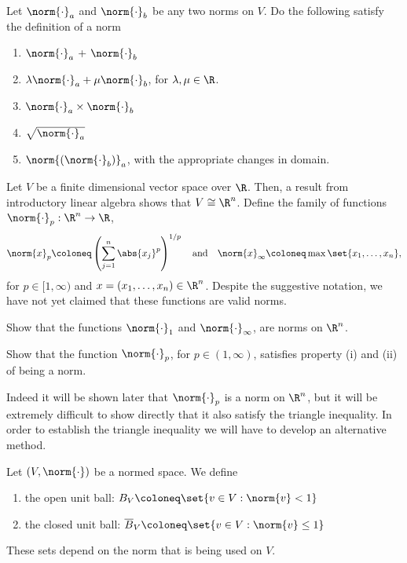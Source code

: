 \documentclass[draft]{penrose}
\newcommand{\oB}{B}
\newcommand{\cB}{\overline{B}}
\begin{document}
\begin{nex}
  Let $\norm{\cdot}_a$ and $\norm{\cdot}_b$ be any two norms on $V$. Do the following satisfy the definition of a norm
  \begin{enumerate}
  \item $\norm{\cdot}_a$ + $\norm{\cdot}_b$
  \item $\lambda\norm{\cdot}_a + \mu\norm{\cdot}_b$, for $\lambda, \mu \in \R$.
  \item $\norm{\cdot}_a \times \norm{\cdot}_b$
  \item $\sqrt{\norm{\cdot}_{a}}$
  \item $\norm{\left(\norm{\cdot}_b\right)}_{a}$, with the appropriate changes in domain.
  \end{enumerate}
\end{nex}

Let $V$ be a finite dimensional vector space over $\R$. Then, a result from introductory linear algebra shows that $V \cong \R^n$. Define the family of functions $\norm{\cdot}_{p}:\R^n \to \R$,
\begin{equation*}
  \norm{x}_{p} \coloneq \left(\sum_{j=1}^{n} \abs{x_j}^{p}\right)^{1/p}
  \quad\text{and}\quad
  \norm{x}_{\infty} \coloneq \max \set{x_1, \dots, x_n},
\end{equation*}
for $p \in [1,\infty)$ and $x = (x_1, \dots, x_n) \in \R^n$. Despite the suggestive notation, we have not yet claimed that these functions are valid norms.

\begin{nex}
  Show that the functions $\norm{\cdot}_{1}$ and $\norm{\cdot}_{\infty}$, are norms on $\R^n$.
\end{nex}

\begin{nex}
  Show that the function $\norm{\cdot}_{p}$, for $p \in (1,\infty)$, satisfies property (i) and (ii) of being a norm.
\end{nex}

\begin{remark}
  Indeed it will be shown later that $\norm{\cdot}_{p}$ is a norm on $\R^n$, but it will be extremely difficult to show directly that it also satisfy the triangle inequality. In order to establish the triangle inequality we will have to develop an alternative method.
\end{remark}

\begin{ndfn}
  Let $(V, \norm{\cdot})$ be a normed space. We define
  \begin{enumerate}
  \item the open unit ball: $\oB_{V} \coloneq \set{v \in V : \norm{v} < 1}$
  \item the closed unit ball: $\cB_{V} \coloneq \set{v \in V : \norm{v} \leq 1}$
  \end{enumerate}
\end{ndfn}
These sets depend on the norm that is being used on $V$.
\end{document}
